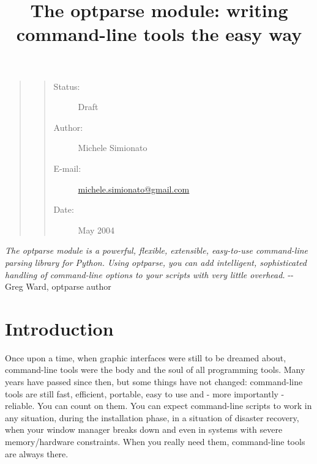 \documentclass[10pt,a4paper,english]{article}
\title{The optparse module: writing command-line tools the easy way}
\author{}
\date{}
\newlength{\locallinewidth}
\begin{document}
\maketitle


\setlength{\locallinewidth}{\linewidth}
\begin{quote}
\begin{quote}
\begin{description}
\item [Status:]
Draft


\item [Author:]
Michele Simionato


\item [E-mail:]
\href{mailto:michele.simionato@gmail.com}{michele.simionato@gmail.com}


\item [Date:]
May 2004


\end{description}
\end{quote}
\end{quote}

\emph{The optparse module is a powerful, flexible, extensible, easy-to-use 
command-line parsing library for Python. Using optparse, you can add 
intelligent, sophisticated handling of command-line options to your 
scripts with very little overhead.} -{}- Greg Ward, optparse author



\hypertarget{introduction}{}
\section*{Introduction}

Once upon a time, when graphic interfaces were still to be dreamed
about, command-line tools were the body and the soul of all programming
tools. Many years have passed since then, but some things have not 
changed: command-line tools are still fast, efficient, portable, easy 
to use and - more importantly - reliable. You can count on them.
You can expect command-line scripts to work in any situation, 
during the installation phase, in a situation of disaster recovery, when 
your window manager breaks down and even in systems with severe 
memory/hardware constraints. When you really need them, command-line 
tools are always there.
\end{document}
